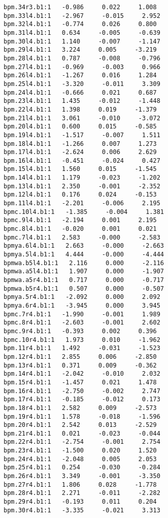 \begin{verbatim}
bpm.34r3.b1:1   -0.986     0.022     1.008
bpm.33l4.b1:1   -2.967     -0.015     2.952
bpm.32l4.b1:1   -0.774     0.026     0.800
bpm.31l4.b1:1   0.634     -0.005     -0.639
bpm.30l4.b1:1   1.140     -0.007     -1.147
bpm.29l4.b1:1   3.224     0.005     -3.219
bpm.28l4.b1:1   0.787     -0.008     -0.796
bpm.27l4.b1:1   -0.969     -0.003     0.966
bpm.26l4.b1:1   -1.267     0.016     1.284
bpm.25l4.b1:1   -3.320     -0.011     3.309
bpm.24l4.b1:1   -0.666     0.021     0.687
bpm.23l4.b1:1   1.435     -0.012     -1.448
bpm.22l4.b1:1   1.398     0.019     -1.379
bpm.21l4.b1:1   3.061     -0.010     -3.072
bpm.20l4.b1:1   0.600     0.015     -0.585
bpm.19l4.b1:1   -1.517     -0.007     1.511
bpm.18l4.b1:1   -1.266     0.007     1.273
bpm.17l4.b1:1   -2.624     0.006     2.629
bpm.16l4.b1:1   -0.451     -0.024     0.427
bpm.15l4.b1:1   1.560     0.015     -1.545
bpm.14l4.b1:1   1.179     -0.023     -1.202
bpm.13l4.b1:1   2.350     -0.001     -2.352
bpm.12l4.b1:1   0.176     0.024     -0.153
bpm.11l4.b1:1   -2.201     -0.006     2.195
bpmc.10l4.b1:1   -1.385     -0.004     1.381
bpmc.9l4.b1:1   -2.194     0.001     2.195
bpmc.8l4.b1:1   -0.020     0.001     0.021
bpmc.7l4.b1:1   2.583     -0.000     -2.583
bpmya.6l4.b1:1   2.663     -0.000     -2.663
bpmya.5l4.b1:1   4.444     -0.000     -4.444
bpmwa.b5l4.b1:1   2.116     0.000     -2.116
bpmwa.a5l4.b1:1   1.907     0.000     -1.907
bpmwa.a5r4.b1:1   0.717     0.000     -0.717
bpmwa.b5r4.b1:1   0.507     0.000     -0.507
bpmya.5r4.b1:1   -2.092     0.000     2.092
bpmya.6r4.b1:1   -3.945     0.000     3.945
bpmc.7r4.b1:1   -1.990     -0.001     1.989
bpmc.8r4.b1:1   -2.603     -0.001     2.602
bpmc.9r4.b1:1   -0.393     0.002     0.396
bpmc.10r4.b1:1   1.973     0.010     -1.962
bpm.11r4.b1:1   1.492     -0.031     -1.523
bpm.12r4.b1:1   2.855     0.006     -2.850
bpm.13r4.b1:1   0.371     0.009     -0.362
bpm.14r4.b1:1   -2.042     -0.010     2.032
bpm.15r4.b1:1   -1.457     0.021     1.478
bpm.16r4.b1:1   -2.750     -0.002     2.747
bpm.17r4.b1:1   -0.185     -0.012     0.173
bpm.18r4.b1:1   2.582     0.009     -2.573
bpm.19r4.b1:1   1.578     -0.018     -1.596
bpm.20r4.b1:1   2.542     0.013     -2.529
bpm.21r4.b1:1   0.021     -0.023     -0.044
bpm.22r4.b1:1   -2.754     -0.001     2.754
bpm.23r4.b1:1   -1.500     0.020     1.520
bpm.24r4.b1:1   -2.048     0.005     2.053
bpm.25r4.b1:1   0.254     -0.030     -0.284
bpm.26r4.b1:1   3.349     -0.001     -3.350
bpm.27r4.b1:1   1.806     0.028     -1.778
bpm.28r4.b1:1   2.271     -0.011     -2.282
bpm.29r4.b1:1   -0.193     0.011     0.204
bpm.30r4.b1:1   -3.335     -0.021     3.313

\end{verbatim}
